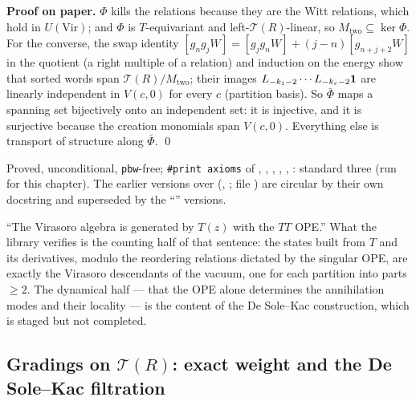 \textbf{Proof on paper.} $\Phi$ kills the relations because they are the Witt relations, which hold in $U(\mathrm{Vir})$; and $\Phi$ is
$T$-equivariant and left-$\mathcal T(R)$-linear, so $M_{\mathrm{two}}\subseteq\ker\Phi$. For the converse, the swap identity
$[g_ng_jW] = [g_jg_nW]+(j-n)[g_{n+j+2}W]$ in the quotient (a right multiple of a relation) and induction on the energy show that
sorted words span $\mathcal T(R)/M_{\mathrm{two}}$; their images $L_{-k_1-2}\cdots L_{-k_r-2}\mathbf{1}$ are linearly independent in
$V(c,0)$ for every $c$ (partition basis). So $\bar\Phi$ maps a spanning set bijectively onto an independent set: it is injective,
and it is surjective because the creation monomials span $V(c,0)$. Everything else is transport of structure along $\bar\Phi$. \qed

\begin{status}
Proved, unconditional, \texttt{pbw}-free; \texttt{\#print axioms} of \allowbreak{}\allowbreak{}\allowbreak{}\allowbreak{}\allowbreak{},
, \allowbreak{}\allowbreak{}, \allowbreak{}\allowbreak{}\allowbreak{},
, : standard three (run for this chapter). The earlier versions over
 (\allowbreak{}\allowbreak{}, ; file
) are circular by their own docstring and superseded by the ``'' versions.
\end{status}

\begin{physics}
``The Virasoro algebra is generated by $T(z)$ with the $TT$ OPE.'' What the library verifies is the counting half of that sentence:
the states built from $T$ and its derivatives, modulo the reordering relations dictated by the singular OPE, are exactly the
Virasoro descendants of the vacuum, one for each partition into parts $\ge2$. The dynamical half --- that the OPE alone determines
the annihilation modes and their locality --- is the content of the De Sole--Kac construction, which is staged but not completed.
\end{physics}

\subsection{Gradings on \texorpdfstring{$\mathcal T(R)$}{T(R)}: exact weight and the De Sole--Kac filtration}\label{l11:sec:dskgrading}

